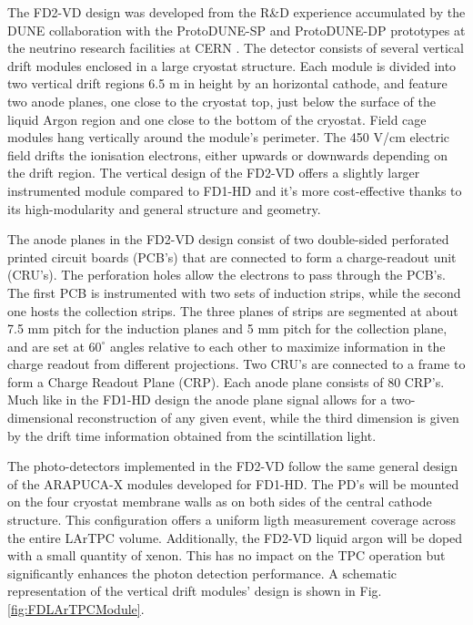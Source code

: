 The FD2-VD design was developed from the R\&D experience accumulated by the DUNE collaboration with the ProtoDUNE-SP and ProtoDUNE-DP prototypes at the neutrino research facilities at CERN \cite{DUNE:2023TDRVD}. The detector consists of several vertical drift modules enclosed in a large cryostat structure. Each module is divided into two vertical drift regions 6.5 m in height by an horizontal cathode, and feature two anode planes, one close to the cryostat top, just below the surface of the liquid Argon region and one close to the bottom of the cryostat. Field cage modules hang vertically around the module's perimeter. The 450 V/cm electric field drifts the ionisation electrons, either upwards or downwards depending on the drift region. The vertical design of the FD2-VD offers a slightly larger instrumented module compared to FD1-HD and it's more cost-effective thanks to its high-modularity and general structure and geometry. 

The anode planes in the FD2-VD design consist of two double-sided perforated printed circuit boards (PCB's) that are connected to form a charge-readout unit (CRU's). The perforation holes allow the electrons to pass through the PCB's. The first PCB is instrumented with two sets of induction strips, while the second one hosts the collection strips. The three planes of strips are segmented at about 7.5 mm pitch for the induction planes and 5 mm pitch for the collection plane, and are set at $60^\circ$ angles relative to each other to maximize information in the charge readout from different projections. Two CRU's are connected to a frame to form a Charge Readout Plane (CRP). Each anode plane consists of 80 CRP's. Much like in the FD1-HD design the anode plane signal allows for a two-dimensional reconstruction of any given event, while the third dimension is given by the drift time information obtained from the scintillation light.

The photo-detectors implemented in the FD2-VD follow the same general design of the ARAPUCA-X modules developed for FD1-HD. The PD's will be mounted on the four cryostat membrane walls as on both sides of the central cathode structure. This configuration offers a uniform ligth measurement coverage across the entire LArTPC volume. Additionally, the FD2-VD liquid argon will be doped with a small quantity of xenon. This has no impact on the TPC operation but significantly enhances the photon detection performance. A schematic representation of the vertical drift modules' design is shown in Fig. \ref{fig:FDLArTPCModule}.

